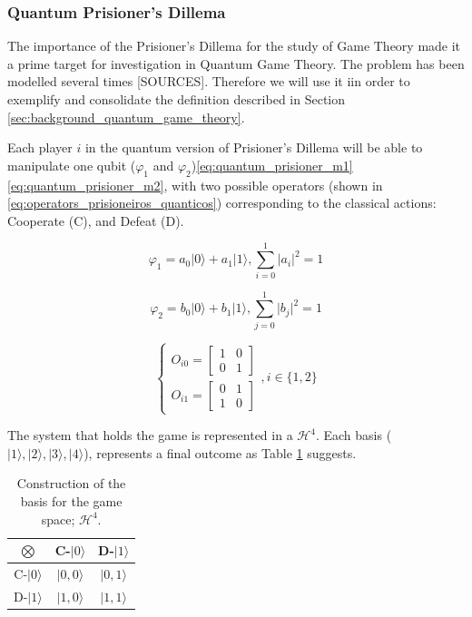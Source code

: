 \subsubsection{Quantum Prisioner's Dillema}
\label{subsubsec:quantum_prisioners_dillema}

The importance of the Prisioner's Dillema for the study of Game Theory made it a prime target for investigation in Quantum Game Theory. The problem has been modelled several times [SOURCES]. Therefore we will use it iin order to exemplify and consolidate the definition described in Section \ref{sec:background_quantum_game_theory}. 

Each player $i$ in the quantum version of Prisioner's Dillema will be able to manipulate one qubit ($\varphi_{1}$ and $\varphi_{2}$)\ref{eq:quantum_prisioner_m1}\ref{eq:quantum_prisioner_m2}, with two possible operators (shown in \ref{eq:operators_prisioneiros_quanticos}) corresponding to the classical actions: Cooperate (C), and Defeat (D). 

\begin{equation}
\label{eq:quantum_prisioner_m1}
\varphi_{1}=a_{0}\vert0\rangle+a_{1}\vert1\rangle,\sum_{i=0}^{1}\vert a_{i}\vert^{2}=1
\end{equation}


\begin{equation}
\label{eq:quantum_prisioner_m2}
\varphi_{2}=b_{0}\vert0\rangle+b_{1}\vert1\rangle,\sum_{j=0}^{1}\vert b_{j}\vert^{2}=1
\end{equation}

\begin{equation}
\label{eq:operators_prisioneiros_quanticos}
\begin{cases}
O_{i0}=\left[\begin{array}{cc}
1 & 0\\
0 & 1
\end{array}\right]\\
O_{i1}=\left[\begin{array}{cc}
0 & 1\\
1 & 0
\end{array}\right]
\end{cases} , i \in \{ 1, 2 \}
\end{equation}


The system that holds the game is represented in a $\mathcal{H}^{4}$. Each basis ($\vert 1\rangle, \vert 2\rangle, \vert 3\rangle, \vert 4\rangle$), represents a final outcome as Table \ref{tab:prisioners_m} suggests.

\begin{table}
\begin{centering}
\begin{tabular}{ccc}
\hline 
$\bigotimes$ & C-$\vert 0\rangle$ & D-$\vert 1\rangle$\tabularnewline
\hline 
C-$\vert 0\rangle$ & $\vert 0,0\rangle$ & $\vert 0,1\rangle$\tabularnewline
D-$\vert 1\rangle$ & $\vert 1,0\rangle$ & $\vert 1,1\rangle$\tabularnewline
\hline 
\end{tabular}
\par\end{centering}

\caption{Construction of the basis for the game space; $\mathcal{H}^{4}$.}
\label{tab:prisioners_m}
\end{table}

